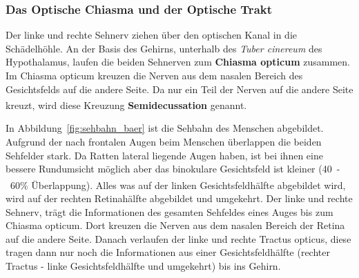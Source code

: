 \documentclass[12pt,a4paper,pdftex]{article}
\begin{document}
\subsubsection*{Das Optische Chiasma und der Optische Trakt}

Der linke und rechte Sehnerv ziehen über den optischen Kanal in die Schädelhöhle. An der Basis des Gehirns, unterhalb des \textit{Tuber cinereum} des Hypothalamus, laufen die beiden Sehnerven zum \textbf{Chiasma opticum}  zusammen. 
Im Chiasma opticum kreuzen die Nerven aus dem nasalen Bereich des Gesichtsfelds auf die andere Seite. Da nur ein Teil der Nerven auf die andere Seite kreuzt, wird diese Kreuzung \textbf{Semidecussation}  genannt. \textsuperscript{\cite[15]{crossman2014neuroanatomy}} 

In Abbildung~\ref{fig:sehbahn_baer} ist die Sehbahn des Menschen abgebildet. Aufgrund der nach frontalen Augen beim Menschen überlappen die beiden Sehfelder stark. Da Ratten lateral liegende Augen haben, ist bei ihnen eine bessere Rundumsicht möglich aber das binokulare Gesichtsfeld ist kleiner (40~-~60\% Überlappung). \textsuperscript{\cite[30]{paxinos2014rat}}
Alles was auf der linken Gesichtsfeldhälfte abgebildet wird, wird auf der rechten Retinahälfte abgebildet und umgekehrt. Der linke und rechte Sehnerv, trägt die Informationen des gesamten Sehfeldes eines Auges bis zum Chiasma opticum. Dort kreuzen die Nerven aus dem nasalen Bereich der Retina auf die andere Seite. Danach verlaufen der linke und rechte Tractus opticus,  diese tragen dann nur noch die Informationen aus einer Gesichtsfeldhälfte (rechter Tractus - linke Gesichtsfeldhälfte und umgekehrt) bis ins Gehirn.
\end{document}
